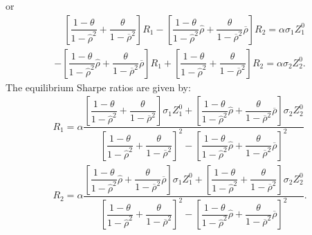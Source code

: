 \documentclass[10pt]{article}
\begin{document}
or
\begin{eqnarray*}
& \quad \left[ \dfrac{1 - \theta}{1 - {\hat \rho}^2} + \dfrac{\theta}{1 - \overline{\rho}^2} \right] R_1 - \left[ \dfrac{1 - \theta}{1 - {\hat \rho}^2} {\hat \rho} + \dfrac{\theta}{1 - \overline{\rho}^2} \overline{\rho} \right] R_2 = \alpha \sigma_1 Z_1^0 & \\
& - \left[ \dfrac{1 - \theta}{1 - {\hat \rho}^2} {\hat \rho} + \dfrac{\theta}{1 - \overline{\rho}^2} \overline{\rho} \right] R_1 + \left[ \dfrac{1 - \theta}{1 - {\hat \rho}^2} + \dfrac{\theta}{1 - \overline{\rho}^2} \right] R_2 = \alpha \sigma_2 Z_2^0. & 
\end{eqnarray*}
The equilibrium Sharpe ratios are given by:
\begin{eqnarray}
& R_1 = \alpha \dfrac{\left[ \dfrac{1 - \theta}{1 - {\hat \rho}^2} + \dfrac{\theta}{1 - \overline{\rho}^2} \right] \sigma_1 Z_1^0 + \left[ \dfrac{1 - \theta}{1 - {\hat \rho}^2} {\hat \rho} + \dfrac{\theta}{1 - \overline{\rho}^2} \overline{\rho} \right] \sigma_2 Z_2^0}{\left[ \dfrac{1 - \theta}{1 - {\hat \rho}^2} + \dfrac{\theta}{1 - \overline{\rho}^2} \right]^2 - \left[ \dfrac{1 - \theta}{1 - {\hat \rho}^2} {\hat \rho} + \dfrac{\theta}{1 - \overline{\rho}^2} \overline{\rho} \right]^2} & \\
& R_2 = \alpha \dfrac{\left[ \dfrac{1 - \theta}{1 - {\hat \rho}^2} {\hat \rho} + \dfrac{\theta}{1 - \overline{\rho}^2} \overline{\rho} \right] \sigma_1 Z_1^0 + \left[ \dfrac{1 - \theta}{1 - {\hat \rho}^2} + \dfrac{\theta}{1 - \overline{\rho}^2} \right] \sigma_2 Z_2^0}{\left[ \dfrac{1 - \theta}{1 - {\hat \rho}^2} + \dfrac{\theta}{1 - \overline{\rho}^2} \right]^2 - \left[ \dfrac{1 - \theta}{1 - {\hat \rho}^2} {\hat \rho} + \dfrac{\theta}{1 - \overline{\rho}^2} \overline{\rho} \right]^2}. &
\end{eqnarray}
\end{document}
